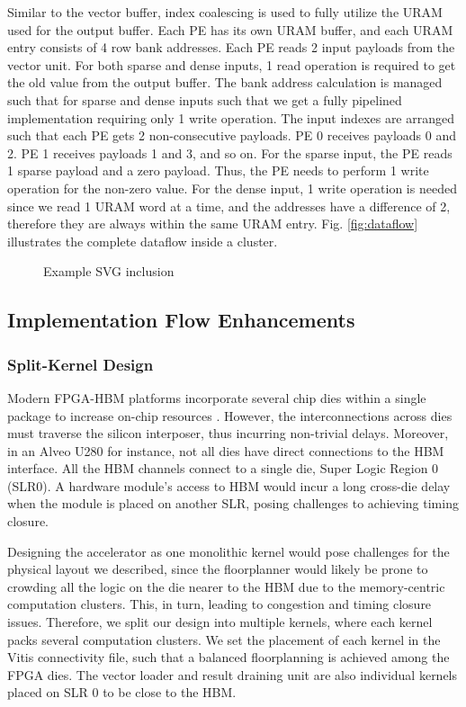 \documentclass[manuscript,screen,review]{acmart}
\begin{document}
Similar to the vector buffer, index coalescing is used to fully utilize the URAM used for the output buffer. Each PE has its own URAM buffer, and each URAM entry consists of 4 row bank addresses. Each PE reads 2 input payloads from the vector unit. For both sparse and dense inputs, 1 read operation is required to get the old value from the output buffer. The bank address calculation is managed such that for sparse and dense inputs such that we get a fully pipelined implementation requiring only 1 write operation. The input indexes are arranged such that each PE gets 2 non-consecutive payloads. PE 0 receives payloads 0 and 2. PE 1 receives payloads 1 and 3, and so on. For the sparse input, the PE reads 1 sparse payload and a zero payload. Thus, the PE needs to perform 1 write operation for the non-zero value. For the dense input, 1 write operation is needed since we read 1 URAM word at a time, and the addresses have a difference of 2, therefore they are always within the same URAM entry.  Fig. \ref{fig:dataflow} illustrates the complete dataflow inside a cluster.


\begin{figure}[h]
	\centering
	
	\caption{Example SVG inclusion}
	\label{fig:pe}
\end{figure}

\subsection{Implementation Flow Enhancements}
\subsubsection{Split-Kernel Design}

Modern FPGA-HBM platforms incorporate several chip dies within a single package to
increase on-chip resources \cite{autobridge}. However, the interconnections across dies must traverse the silicon interposer, thus incurring non-trivial delays.
Moreover, in an Alveo U280 for instance, not all dies have direct connections to the HBM interface. All the HBM channels connect to a single die, Super Logic Region 0 (SLR0). A hardware module’s access to HBM would incur a long cross-die delay when the module is placed on another SLR, posing challenges to achieving timing closure.

Designing the accelerator as one monolithic kernel would pose challenges for the physical layout we described, since the floorplanner would likely be prone to crowding all the logic on the die nearer to the HBM due to the memory-centric computation clusters. This, in turn, leading to congestion and timing closure issues. Therefore, we split our design into multiple kernels, where each kernel packs several computation clusters. We set the placement of each kernel in the Vitis connectivity file, such that a balanced floorplanning is achieved among the FPGA dies. The vector loader and result draining unit are also individual kernels placed on SLR 0 to be close to the HBM.
\end{document}
